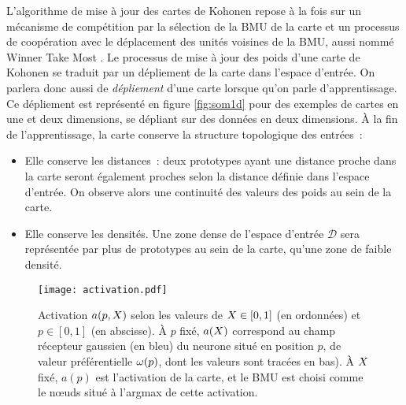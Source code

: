 \documentclass[../main]{subfiles}
\begin{document}
L'algorithme de mise à jour des cartes de Kohonen repose à la fois sur un mécanisme de compétition par la sélection de la BMU de la carte et un processus de coopération avec le déplacement des unités voisines de la BMU, aussi nommé \og Winner Take Most \fg{}.
Le processus de mise à jour des poids d'une carte de Kohonen se traduit par un dépliement de la carte dans l'espace d'entrée. On parlera donc aussi de \emph{dépliement} d'une carte lorsque qu'on parle d'apprentissage. Ce dépliement est représenté en figure \ref{fig:som1d} pour des exemples de cartes en une et deux dimensions, se dépliant sur des données en deux dimensions.
\`A la fin de l'apprentissage, la carte conserve la structure topologique des entrées~:
\begin{itemize}
\item Elle conserve les distances~: deux prototypes ayant une distance proche dans la carte seront également proches selon la distance définie dans l'espace d'entrée. On observe alors une continuité des valeurs des poids au sein de la carte.
\item Elle conserve les densités. Une zone dense de l'espace d'entrée $\mathcal{D}$ sera représentée par plus de prototypes au sein de la carte, qu'une zone de faible densité.
\end{itemize}

\begin{figure}
    \centering\texttt{[image: activation.pdf]}
    \caption{Activation $a(p, X)$ selon les valeurs de $X \in [0,1]$ (en ordonnées) et $p \in [0,1]$ (en abscisse). \`A  $p$ fixé, $a(X)$ correspond au champ récepteur gaussien (en bleu) du neurone situé en position $p$, de valeur préférentielle $\omega(p)$, dont les valeurs sont tracées en bas).
    \`A $X$ fixé, $a(p)$ est l'activation de la carte, et le BMU est choisi comme le n\oe{}uds situé à l'argmax de cette activation. \label{fig:activation}
    }
\end{figure}
\end{document}
